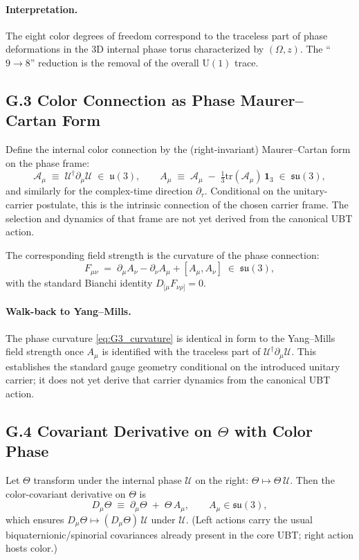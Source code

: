 \paragraph{Interpretation.} 
The eight color degrees of freedom correspond to the traceless part of phase deformations in the 3D internal phase torus characterized by $(\Omega,z)$. The “$9\to 8$” reduction is the removal of the overall $\mathrm{U}(1)$ trace.

\subsection*{G.3 Color Connection as Phase Maurer–Cartan Form}
Define the internal color connection by the (right-invariant) Maurer–Cartan form on the phase frame:
\begin{equation}
\label{eq:G3_MC}
\mathcal{A}_\mu\;\equiv\; \mathcal{U}^\dagger \partial_\mu \mathcal{U}\;\in\;\mathfrak{u}(3), 
\qquad 
A_\mu\;\equiv\;\mathcal{A}_\mu\;-\;\tfrac{1}{3}\mathrm{tr}(\mathcal{A}_\mu)\,\mathbf{1}_3\;\in\;\mathfrak{su}(3),
\end{equation}
and similarly for the complex-time direction $\partial_\tau$. 
Conditional on the unitary-carrier postulate, this is the intrinsic connection of the chosen carrier frame.  The selection and dynamics of that frame are not yet derived from the canonical UBT action.

The corresponding field strength is the curvature of the phase connection:
\begin{equation}
\label{eq:G3_curvature}
F_{\mu\nu}\;=\;\partial_\mu A_\nu-\partial_\nu A_\mu+[A_\mu,A_\nu]\;\in\;\mathfrak{su}(3),
\end{equation}
with the standard Bianchi identity $D_{[\mu}F_{\nu\rho]}=0$.

\paragraph{Walk-back to Yang–Mills.}
The phase curvature \eqref{eq:G3_curvature} is identical in form to the Yang--Mills field strength once $A_\mu$ is identified with the traceless part of $\mathcal{U}^\dagger \partial_\mu \mathcal{U}$.  This establishes the standard gauge geometry conditional on the introduced unitary carrier; it does not yet derive that carrier dynamics from the canonical UBT action.

\subsection*{G.4 Covariant Derivative on \texorpdfstring{$\Theta$}{Theta} with Color Phase}
Let $\Theta$ transform under the internal phase $\mathcal{U}$ on the right:
$\Theta \mapsto \Theta\,\mathcal{U}$. 
Then the color-covariant derivative on $\Theta$ is
\begin{equation}
\label{eq:G4_covD}
D_\mu \Theta \;\equiv\; \partial_\mu \Theta \;+\; \Theta\, A_\mu,
\qquad A_\mu \in \mathfrak{su}(3),
\end{equation}
which ensures $D_\mu \Theta \mapsto (D_\mu \Theta)\,\mathcal{U}$ under $\mathcal{U}$.
(Left actions carry the usual biquaternionic/spinorial covariances already present in the core UBT; right action hosts color.)

